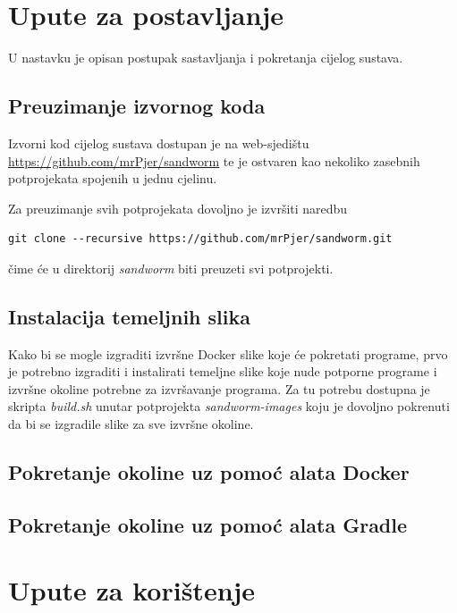 \documentclass[times, utf8, zavrsni]{fer}
\begin{document}
{{\begin{appendices}

\chapter{Upute za postavljanje}

U nastavku je opisan postupak sastavljanja i pokretanja cijelog sustava. 

\section{Preuzimanje izvornog koda}

Izvorni kod cijelog sustava dostupan je na web-sjedištu {\url{https://github.com/mrPjer/sandworm}} te je ostvaren kao nekoliko zasebnih potprojekata spojenih u jednu cjelinu.

Za preuzimanje svih potprojekata dovoljno je izvršiti naredbu

\begin{lstlisting}
git clone --recursive https://github.com/mrPjer/sandworm.git
\end{lstlisting}

čime će u direktorij {\textit{sandworm}} biti preuzeti svi potprojekti.

\section{Instalacija temeljnih slika}
\label{sec:base-images}

Kako bi se mogle izgraditi izvršne Docker slike koje će pokretati programe, prvo je potrebno izgraditi i instalirati temeljne slike koje nude potporne programe i izvršne okoline potrebne za izvršavanje programa. Za tu potrebu dostupna je skripta {\textit{build.sh}} unutar potprojekta {\textit{sandworm-images}} koju je dovoljno pokrenuti da bi se izgradile slike za sve izvršne okoline.

\section{Pokretanje okoline uz pomoć alata Docker}

\section{Pokretanje okoline uz pomoć alata Gradle}

\chapter{Upute za korištenje}


\end{appendices}}}
\end{document}
